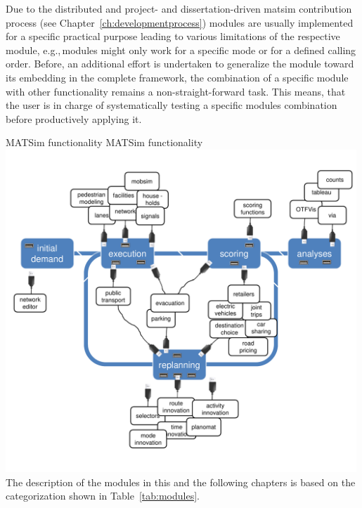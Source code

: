 Due to the distributed and project- and dissertation-driven \gls{matsim} contribution process (see Chapter~\ref{ch:developmentprocess}) modules are usually implemented for a specific practical purpose leading to various limitations of the respective module, e.g.,\,modules might only work for a specific mode or for a defined calling order. Before, an additional effort is undertaken to generalize the module toward its embedding in the complete framework, the combination of a specific module with other functionality remains a non-straight-forward task. This means, that the user is in charge of systematically testing a specific modules combination before productively applying it.

\createfigure%
{MATSim functionality}%
{MATSim functionality}%
{\label{fig:matsimmodules}}%
{\includegraphics[width=0.99\textwidth, angle=0]{extending/figures/modules.pdf}}%
{}
%
The description of the modules in this and the following chapters is based on the categorization shown in Table~\ref{tab:modules}.
%

